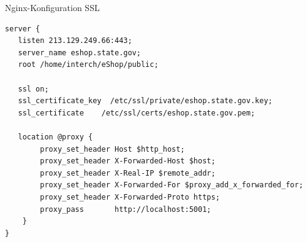 \begin{frame}[fragile]{Nginx-Konfiguration SSL}
\begin{lstlisting}
server {
   listen 213.129.249.66:443;
   server_name eshop.state.gov;
   root /home/interch/eShop/public;

   ssl on;
   ssl_certificate_key  /etc/ssl/private/eshop.state.gov.key;
   ssl_certificate    /etc/ssl/certs/eshop.state.gov.pem;

   location @proxy {
        proxy_set_header Host $http_host;
        proxy_set_header X-Forwarded-Host $host;
        proxy_set_header X-Real-IP $remote_addr;
        proxy_set_header X-Forwarded-For $proxy_add_x_forwarded_for;
        proxy_set_header X-Forwarded-Proto https;
        proxy_pass       http://localhost:5001;
    }
}
\end{lstlisting}
\end{frame}



